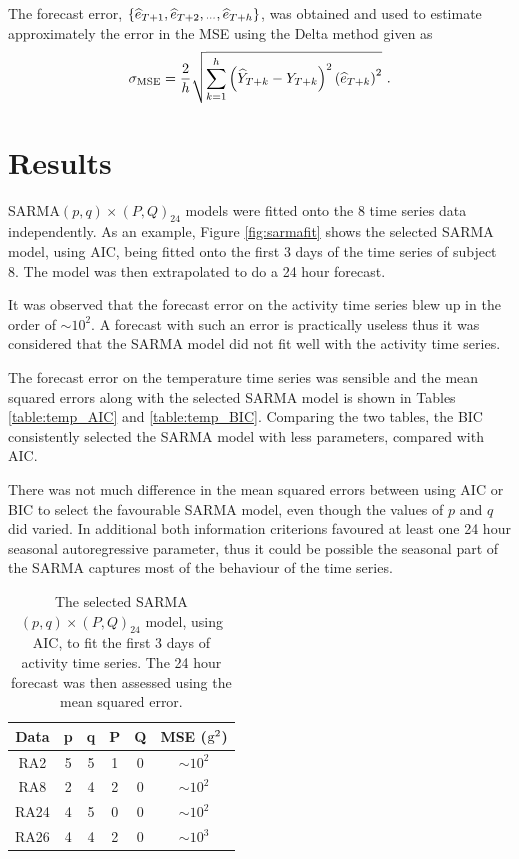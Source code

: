 \documentclass[a4paper]{proc}
\newcommand{\dotdotdot}{\vphantom{.}_{\cdots}}
\begin{document}
The forecast error, $\{\widehat{e}_{T+1},\widehat{e}_{T+2},\dotdotdot,\widehat{e}_{T+h}\}$, was obtained and used to estimate approximately the error in the MSE using the Delta method given as
\begin{equation}
\sigma_{\textup{MSE}} = \frac{2}{h}\sqrt{\sum_{k=1}^{h}\left(\widehat{Y}_{T+k}-Y_{T+k}\right)^2\left(\widehat{e}_{T+k}\right)^2} \ .
\end{equation}

\section{Results}
SARMA$(p,q)\times(P,Q)_{24}$ models were fitted onto the 8 time series data independently. As an example, Figure \ref{fig:sarmafit} shows the selected SARMA model, using AIC, being fitted onto the first 3 days of the time series of subject 8. The model was then extrapolated to do a 24 hour forecast.

It was observed that the forecast error on the activity time series blew up in the order of $\sim 10^2$. A forecast with such an error is practically useless thus it was considered that the SARMA model did not fit well with the activity time series.

The forecast error on the temperature time series was sensible and the mean squared errors along with the selected SARMA model is shown in Tables \ref{table:temp_AIC} and \ref{table:temp_BIC}. Comparing the two tables, the BIC consistently selected the SARMA model with less parameters, compared with AIC.

There was not much difference in the mean squared errors between using AIC or BIC to select the favourable SARMA model, even though the values of $p$ and $q$ did varied. In additional both information criterions favoured at least one 24 hour seasonal autoregressive parameter, thus it could be possible the seasonal part of the SARMA captures most of the behaviour of the time series.

\begin{table}[p]
\begin{center}
\begin{tabular}{ cccccc } 
 Data & p & q & P & Q & MSE ($\textup{g}^2$)\\
  \hline
 RA2 & 5 & 5 & 1 & 0 & $\sim10^2$\\
 RA8 & 2 & 4 & 2 & 0 & $\sim10^2$\\
 RA24& 4 & 5 & 0 & 0 & $\sim10^2$\\
 RA26& 4 & 4 & 2 & 0 & $\sim10^3$\\
\end{tabular}
\end{center}
\caption{The selected SARMA$(p,q)\times(P,Q)_{24}$ model, using AIC, to fit the first 3 days of activity time series. The 24 hour forecast was then assessed using the mean squared error.}
\label{table:ra_AIC}
\end{table}
\end{document}
